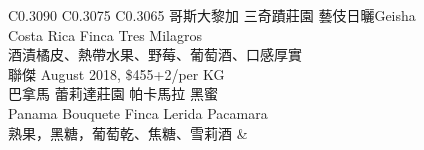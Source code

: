 \documentclass[10pt,a4paper]{article}
\begin{document}
\begin{tabular}{C{0.3090\textwidth} C{0.3075\textwidth} C{0.3065\textwidth}}
{%
哥斯大黎加 三奇蹟莊園 藝伎日曬Geisha \vspace*{-0.12em} \\ Costa Rica Finca Tres Milagros%
 \vspace*{-0.22em} \\ %
\footnotesize 酒漬橘皮、熱帶水果、野莓、葡萄酒、口感厚實%
\vspace*{0.345em}\\%
聯傑 August  2018,  \$455+2/per KG \vspace*{-0.2em} \\ %
巴拿馬  蕾莉達莊園 帕卡馬拉 黑蜜 \vspace*{-0.12em} \\ Panama Bouquete Finca Lerida Pacamara %
 \vspace*{-0.22em} \\ %
\footnotesize 熟果，黑糖，葡萄乾、焦糖、雪莉酒%
%
}& \shortstack[c]{
%
%
}
\end{tabular}
\end{document}
